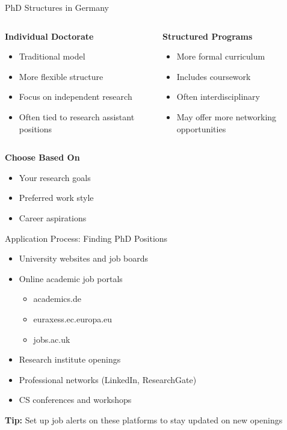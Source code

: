 \documentclass[aspectratio=169,10pt]{beamer}
\begin{document}
\begin{frame}{PhD Structures in Germany}
    \begin{columns}[T]
        \begin{column}{0.5\textwidth}
            \textbf{Individual Doctorate}
            \begin{itemize}
                \item Traditional model
                \item More flexible structure
                \item Focus on independent research
                \item Often tied to research assistant positions
            \end{itemize}
        \end{column}
        \begin{column}{0.5\textwidth}
            \textbf{Structured Programs}
            \begin{itemize}
                \item More formal curriculum
                \item Includes coursework
                \item Often interdisciplinary
                \item May offer more networking opportunities
            \end{itemize}
        \end{column}
    \end{columns}
    
    \textbf{Choose Based On}
    \begin{itemize}
        \item Your research goals
        \item Preferred work style
        \item Career aspirations
    \end{itemize}
\end{frame}

\begin{frame}{Application Process: Finding PhD Positions}
    \begin{itemize}
        \item University websites and job boards
        \item Online academic job portals
            \begin{itemize}
                \item academics.de
                \item euraxess.ec.europa.eu
                \item jobs.ac.uk
            \end{itemize}
        \item Research institute openings
        \item Professional networks (LinkedIn, ResearchGate)
        \item CS conferences and workshops
    \end{itemize}
    
    \textbf{Tip:} Set up job alerts on these platforms to stay updated on new openings
\end{frame}
\end{document}
